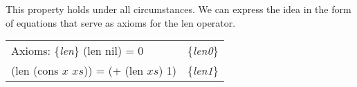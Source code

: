 \begin{comment} ...suppressing defthm for now...
When a property holds under all circumstances, we can sometimes use the automated logic of ACL2 to prove it. To do so, we formulate the property as a theorem and press the ``Start'' button in the Dracula proof panel (right side of Dracula window). When the ``ACL2!\verb+>+'' prompt appears in the lower pane in the proof panel, we press the ``Admit'' arrow, and the automated logic of ACL2 starts trying to prove the theorem.

Theorem definitions are similar to property definitions, but the keyword is ``defthmd'' instead of ``defproperty''. The following theorem definition states the len-test property in a form that the automated logic of ACL2 can use to attempt a proof that the property holds under all circumstances.

\label{len-thm}
\begin{lstlisting}
(defthmd len-thm
  (= (len xs)
     (if (consp xs)
         (+ 1 (len (rest xs))) ; {len1}
         0)))                  ; {len0}
\end{lstlisting}

ACL2 interprets variables in theorems as if they were universally quantified. So, the formula ``(= (len $xs$) (if (consp $xs$) (+ 1 (len (rest $xs$))) 0))'' in the definition of len-thm means ``($\forall$$xs$.(= (len $xs$) (if (consp $xs$) (+ 1 (len (rest $xs$))) 0)))''.
In this case, ACL2 successfully proves the theorem, and Dracula colors the theorem green. (If ACL2 had failed to prove the theorem, Dracula would have colored it pink.) Because ACL2 succeeds in proving the theorem, we know that the ``len-test'' property from our doublecheck testing is true under all circumstances. We can cite this fact in proofs.

The len theorem contains two formulas that have the same meaning as (len $xs$). One of them, which we have labeled ``\{\emph{len1}\}'', applies when the argument in an invocation of len is a list with at least one element (that is, (consp $xs$) is true).  The other formula, which we have labeled ``\{\emph{len0}\}'', applies when the argument is the empty list (nil).
\end{comment}

This property holds under all circumstances. We can express the idea in the form of equations that serve as axioms for the len operator.

\label{len-equations}
\begin{center}
\begin{tabular}{ll}
Axioms: \{\emph{len}\}
(len nil) = 0                            & \{\emph{len0}\} \\
(len (cons $x$ $xs$)) = (+ (len $xs$) 1) & \{\emph{len1}\}
\end{tabular}
\end{center}

